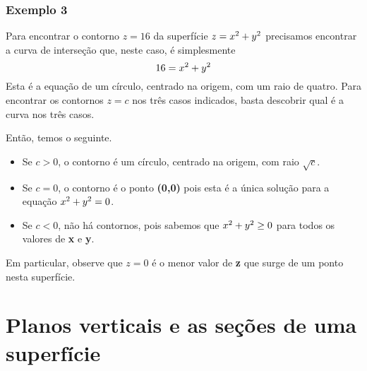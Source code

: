 \documentclass[a4paper]{article}
\begin{document}
\subsubsection*{Exemplo 3}
Para encontrar o contorno $z = 16$ da superfície $z = x\textsuperscript2 + y\textsuperscript2$ precisamos encontrar a curva de interseção que, neste caso, é simplesmente
    \begin{equation}
         16 = x\textsuperscript2 + y\textsuperscript2
    \end{equation}
Esta é a equação de um círculo, centrado na origem, com um raio de quatro.
Para encontrar os contornos $z = c$ nos três casos indicados, basta descobrir qual é a curva nos três casos.
\par Então, temos o seguinte.
\begin{itemize}
    \item Se $c > 0$, o contorno é um círculo, centrado na origem, com raio $\sqrt{c}$.
    \item Se $c = 0$, o contorno é o ponto \textbf{(0,0)} pois esta é a única solução para a equação $x\textsuperscript2 + y\textsuperscript2 = 0$.
    \item Se $c < 0$, não há contornos, pois sabemos que $x\textsuperscript2 + y\textsuperscript2 \geq 0$ para todos os valores de \textbf{x} e \textbf{y}.
\end{itemize}
Em particular, observe que $z = 0$ é o menor valor de \textbf{z} que surge de um ponto nesta superfície.
\section{Planos verticais e as seções de uma superfície}
\end{document}
